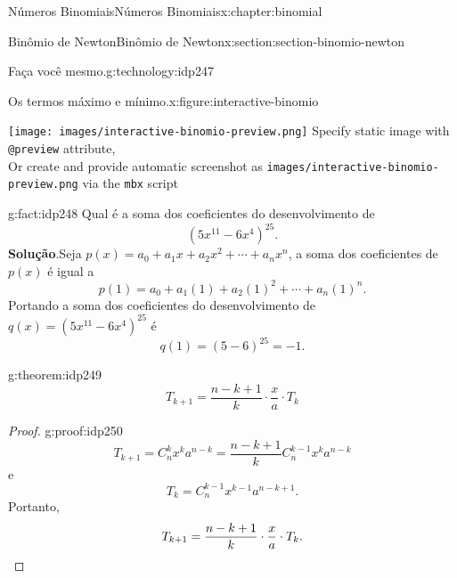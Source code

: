 \documentclass[oneside,10pt,]{book}
\newcommand{\blocktitlefont}{\relax}
\newcommand{\mono}[1]{\texttt{#1}}
\newcommand{\qedhere}{\relax}
\numberwithin{equation}{section}
\newlength{\qrsize}
\newlength{\previewwidth}
\begin{document}
\begin{chapterptx}{Números Binomiais}{}{Números Binomiais}{}{}{x:chapter:binomial}
\begin{sectionptx}{Binômio de Newton}{}{Binômio de Newton}{}{}{x:section:section-binomio-newton}
\begin{technology}{Faça você mesmo.}{g:technology:idp247}
\begin{figureptx}{Os termos máximo e mínimo.}{x:figure:interactive-binomio}{}
\begin{tcbraster}[raster columns=2, raster column skip=1pt, raster halign=center, raster force size=false, raster left skip=0pt, raster right skip=0pt]
\begin{tcolorbox}[previewstyle, width=\previewwidth]%
%
{\texttt{[image: images/interactive-binomio-preview.png]}}%
{\small{}Specify static image with \mono{@preview} attribute,\\Or create and provide automatic screenshot as \mono{images/interactive-binomio-preview.png} via the \mono{mbx} script}%
\end{tcolorbox}%
\begin{tcolorbox}[qrstyle]%
{\hypersetup{urlcolor=black}}%
\end{tcolorbox}%
\end{tcbraster}%
\tcblower
\end{figureptx}%
\end{technology}
\begin{fact}{}{}{g:fact:idp248}%
Qual é a soma dos coeficientes do desenvolvimento de%
\begin{equation*}
(5x^{11} - 6x^{4})^{25}. 
\end{equation*}
%
\textbf{\blocktitlefont Solução}.\quad{}Seja \(p(x) = a_0 + a_1x + a_2x^2 + \cdots + a_nx^n\), a soma dos coeficientes de \(p(x)\) é igual a%
\begin{equation*}
p(1) = a_0 + a_1(1) + a_2(1)^2 + \cdots + a_n(1)^n.
\end{equation*}
Portando a soma dos coeficientes do desenvolvimento de \(q(x) = (5x^{11} - 6x^{4})^{25}\) é%
\begin{equation*}
q(1) = (5 - 6)^{25} = -1.
\end{equation*}
%
\end{fact}
\begin{theorem}{}{}{g:theorem:idp249}%
%
\begin{equation*}
T_{k+1} = \frac{n-k+1}{k}\cdot\frac{x}{a}\cdot T_k
\end{equation*}
%
\end{theorem}
\begin{proof}{}{g:proof:idp250}
%
\begin{equation*}
T_{k+1} = C_n^kx^ka^{n-k} = \frac{n-k+1}{k}C_n^{k-1}x^ka^{n-k} 
\end{equation*}
e%
\begin{equation*}
T_{k} = C_n^{k-1}x^{k-1}a^{n-k+1}. 
\end{equation*}
Portanto,%
\begin{equation*}
T_{k+1} = \frac{n-k+1}{k}\cdot\frac{x}{a}\cdot T_k.\qedhere
\end{equation*}

\end{proof}
\end{sectionptx}
\end{chapterptx}
\end{document}
